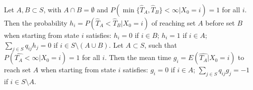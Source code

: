  Let $A, B \subset S$, with $A \cap B = \emptyset$ and $P(\min\{\hat{T}_A, \hat{T}_B\} < \infty | X_0 = i) = 1$ for all $i$. Then the probability $h_i = P(\hat{T}_A < \hat{T}_B | X_0 = i)$ of reaching set $A$ before set $B$ when starting from state $i$ satisfies: 
$h_i = 0$ if $i \in B$; 
$h_i = 1$ if $i \in A$; 
$\sum_{j \in S} q_{ij}h_j = 0$ if $i \in S \setminus (A \cup B)$.
 Let $A \subset S$, such that $P(\hat{T_A} < \infty | X_0 = i) = 1$ for all $i$. Then the mean time $g_i = E(\hat{T_A} | X_0 = i)$ to reach set $A$ when starting from state $i$ satisfies: $g_i = 0$ if $i \in A$; $\sum_{j \in S} q_{ij} g_j = -1$ if $i \in S \setminus A$.